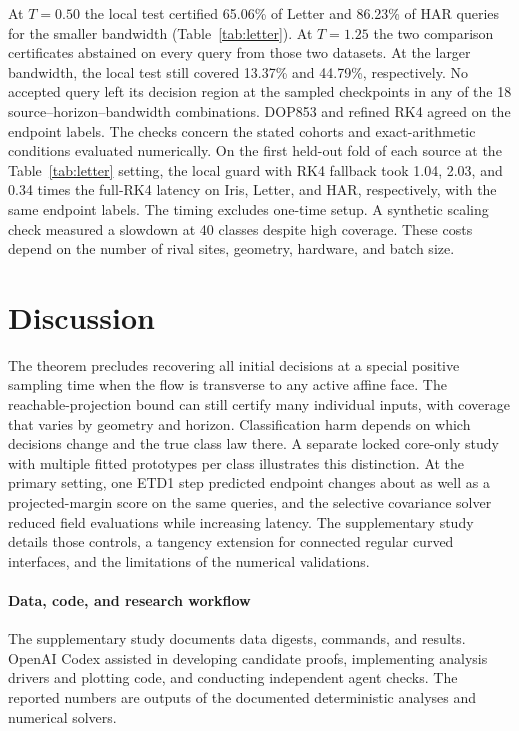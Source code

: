\documentclass[final,5p,twocolumn]{elsarticle}
\begin{document}
At $T=0.50$ the local test certified 65.06\% of Letter and
86.23\% of HAR queries for the smaller bandwidth (Table~\ref{tab:letter}).
At $T=1.25$ the two comparison certificates abstained on every
query from those two datasets. At the larger bandwidth, the local
test still covered 13.37\% and 44.79\%, respectively.
No accepted query left its decision region at the sampled
checkpoints in any of the 18 source--horizon--bandwidth
combinations. DOP853 and refined RK4 agreed on the endpoint labels.
The checks concern the stated cohorts and exact-arithmetic
conditions evaluated numerically. On the first held-out fold of
each source at the Table~\ref{tab:letter} setting, the local guard
with RK4 fallback took 1.04, 2.03, and 0.34 times the full-RK4
latency on Iris, Letter, and HAR, respectively, with the same
endpoint labels. The timing excludes one-time setup. A synthetic
scaling check measured a slowdown at 40 classes despite high
coverage. These costs depend on the number of rival sites,
geometry, hardware, and batch size.

\section{Discussion}

The theorem precludes recovering all initial decisions at a
special positive sampling time when the flow is transverse to any
active affine face. The reachable-projection bound can still certify
many individual inputs, with coverage that varies by geometry and
horizon. Classification harm depends on which decisions change
and the true class law there. A separate locked core-only study
with multiple fitted prototypes per class illustrates this distinction.
At the primary setting, one ETD1 step predicted endpoint changes
about as well as a projected-margin score on the same queries,
and the selective covariance solver reduced field evaluations while
increasing latency. The supplementary study details those controls,
a tangency extension for connected regular curved interfaces, and
the limitations of the numerical validations.

\paragraph{Data, code, and research workflow}
The supplementary study documents data digests, commands, and
results. OpenAI Codex assisted in developing candidate proofs,
implementing analysis drivers and plotting code, and conducting
independent agent checks. The reported numbers are outputs of the
documented deterministic analyses and numerical solvers.
\end{document}
